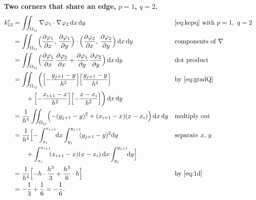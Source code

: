 \documentclass[11pt]{article}
\newcommand{\dxdy}{\,\mathrm{d}x\,\mathrm{d}y}
\newcommand{\Om}{\Omega}
\newcommand{\grad}{\nabla}
\begin{document}
\textbf{Two corners that share an edge, $p=1$, $q=2$.}
\begin{align}
  k^{e}_{12}
  &=\iint_{\Om_{ij}}\grad\varphi_{1}\cdot\grad\varphi_{2}\dxdy
   &&\text{\eqref{eq:kepq} with }p=1,\ q=2\notag\\
  &=\iint_{\Om_{ij}}\Bigl(\frac{\partial\varphi_{1}}{\partial x},\,\frac{\partial\varphi_{1}}{\partial y}\Bigr)\cdot\Bigl(\frac{\partial\varphi_{2}}{\partial x},\,\frac{\partial\varphi_{2}}{\partial y}\Bigr)\dxdy
   &&\text{components of }\grad\notag\\
  &=\iint_{\Om_{ij}}\Bigl(\frac{\partial\varphi_{1}}{\partial x}\,\frac{\partial\varphi_{2}}{\partial x}+\frac{\partial\varphi_{1}}{\partial y}\,\frac{\partial\varphi_{2}}{\partial y}\Bigr)\dxdy
   &&\text{dot product}\notag\\
  &=\iint_{\Om_{ij}}\biggl(\Bigl[-\frac{y_{j+1}-y}{h^{2}}\Bigr]\Bigl[\frac{y_{j+1}-y}{h^{2}}\Bigr]
   &&\text{by \eqref{eq:gradQ}}\notag\\
  &\qquad+\Bigl[-\frac{x_{i+1}-x}{h^{2}}\Bigr]\Bigl[-\frac{x-x_{i}}{h^{2}}\Bigr]\biggr)\dxdy\notag\\
  &=\frac{1}{h^{4}}\iint_{\Om_{ij}}\Bigl(-(y_{j+1}-y)^{2}+(x_{i+1}-x)(x-x_{i})\Bigr)\dxdy
   &&\text{multiply out}\notag\\
  &=\frac{1}{h^{4}}\Bigl[-\int_{x_{i}}^{x_{i+1}}\!\!\mathrm{d}x\int_{y_{j}}^{y_{j+1}}\!\!(y_{j+1}-y)^{2}\mathrm{d}y
   &&\text{separate }x,\,y\notag\\
  &\qquad+\int_{x_{i}}^{x_{i+1}}\!\!(x_{i+1}-x)(x-x_{i})\,\mathrm{d}x\int_{y_{j}}^{y_{j+1}}\!\!\mathrm{d}y\Bigr]\notag\\
  &=\frac{1}{h^{4}}\Bigl[-h\cdot\frac{h^{3}}{3}+\frac{h^{3}}{6}\cdot h\Bigr]
   &&\text{by \eqref{eq:1d}}\notag\\
  &=-\frac13+\frac16=-\frac16 .\label{eq:ke12}
\end{align}
\end{document}
